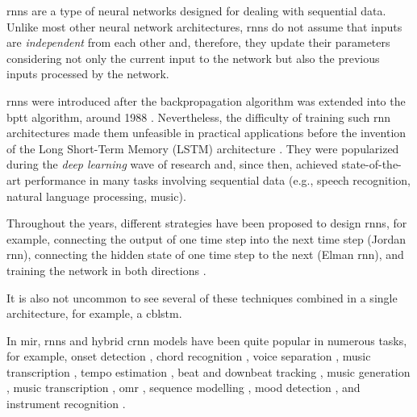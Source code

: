 

\glspl{rnn} are a type of neural networks designed for
dealing with sequential data. Unlike most other neural
network architectures, \glspl{rnn} do not assume that inputs
are \emph{independent} from each other and, therefore, they
update their parameters considering not only the current
input to the network but also the previous inputs processed
by the network.

\glspl{rnn} were introduced after the backpropagation
algorithm \parencite{rumelhart1988learning} was extended
into the \gls{bptt} algorithm, around 1988
\parencite{werbos1988generalization,
werbos1990backpropagation}. Nevertheless, the difficulty of
training such \gls{rnn} architectures made them unfeasible
in practical applications before the invention of the Long
Short-Term Memory (LSTM) architecture
\parencite{hochreiter1997long}. They were popularized during
the \emph{deep learning} wave of research and, since then,
achieved state-of-the-art performance in many tasks
involving sequential data (e.g., speech recognition, natural
language processing, music).

Throughout the years, different strategies have been
proposed to design \glspl{rnn}, for example, connecting the
output of one time step into the next time step (Jordan
\gls{rnn}), connecting the hidden state of one time step to the
next (Elman \gls{rnn}), and training the network in both
directions \parencite{schuster1997bidirectional}.

It is also not uncommon to see several of these techniques
combined in a single architecture, for example, a
\gls{cblstm}.

In \gls{mir}, \glspl{rnn} and hybrid \gls{crnn} models have
been quite popular in numerous tasks, for example, onset
detection \parencite{eyben2010universal}, chord recognition
\parencite{boulangerlewandowski2013audio, sigtia2016endend,
sears2018evaluating}, voice separation
\parencite{huang2014singingvoice}, music transcription
\parencite{sigtia2014rnnbased}, tempo estimation
\parencite{bock2015accurate}, beat and downbeat tracking
\parencite{bock2016joint, krebs2016downbeat}, music
generation \parencite{liu2016predicting, liang2017automatic,
lim2017chord}, music transcription
\parencite{rigaud2016singing, sigtia2016endend,
southall2016automatic, vogl2016recurrent,
southall2017automatic, vogl2017drum, basaran2018main},
\gls{omr} \parencite{calvozaragoza2017onestep,
wel2017optical, calvozaragoza2018cameraprimus}, sequence
modelling \parencite{ycart2017study}, mood detection
\parencite{delbouys2018music}, and instrument recognition
\parencite{gururani2018instrument}.



